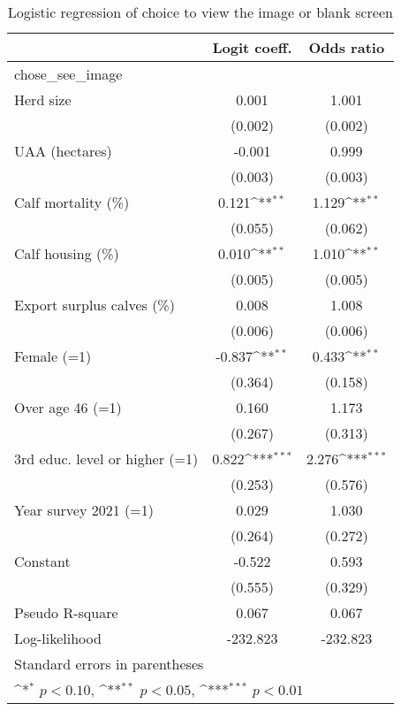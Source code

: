 \begin{table}[htbp]\centering
\def\sym#1{\ifmmode^{#1}\else\(^{#1}\)\fi}
\caption{Logistic regression of choice to view the image or blank screen}
\begin{tabular}{l*{2}{c}}
\hline\hline
            &\multicolumn{1}{c}{Logit coeff.}&\multicolumn{1}{c}{Odds ratio}\\
\hline
chose\_see\_image&                     &                     \\
Herd size   &       0.001         &       1.001         \\
            &     (0.002)         &     (0.002)         \\
[1em]
UAA (hectares)&      -0.001         &       0.999         \\
            &     (0.003)         &     (0.003)         \\
[1em]
Calf mortality (\%)&       0.121\sym{**} &       1.129\sym{**} \\
            &     (0.055)         &     (0.062)         \\
[1em]
Calf housing (\%)&       0.010\sym{**} &       1.010\sym{**} \\
            &     (0.005)         &     (0.005)         \\
[1em]
Export surplus calves (\%)&       0.008         &       1.008         \\
            &     (0.006)         &     (0.006)         \\
[1em]
Female (=1) &      -0.837\sym{**} &       0.433\sym{**} \\
            &     (0.364)         &     (0.158)         \\
[1em]
Over age 46 (=1)&       0.160         &       1.173         \\
            &     (0.267)         &     (0.313)         \\
[1em]
3rd educ. level or higher (=1)&       0.822\sym{***}&       2.276\sym{***}\\
            &     (0.253)         &     (0.576)         \\
[1em]
Year survey 2021 (=1)&       0.029         &       1.030         \\
            &     (0.264)         &     (0.272)         \\
[1em]
Constant    &      -0.522         &       0.593         \\
            &     (0.555)         &     (0.329)         \\
\hline
Pseudo R-square&       0.067         &       0.067         \\
Log-likelihood&    -232.823         &    -232.823         \\
\hline\hline
\multicolumn{3}{l}{\footnotesize Standard errors in parentheses}\\
\multicolumn{3}{l}{\footnotesize \sym{*} \(p<0.10\), \sym{**} \(p<0.05\), \sym{***} \(p<0.01\)}\\
\end{tabular}
\end{table}
